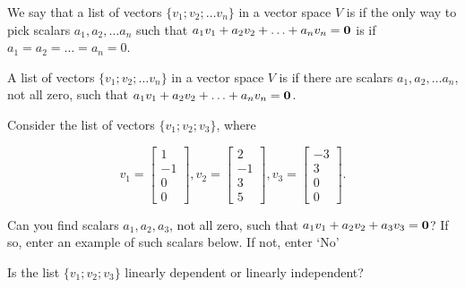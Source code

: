 \edXsolution{ 
}


\endedxproblem


\endedxvertical





We say that a list of vectors $\{v_1; v_2; \ldots v_n\}$ in a vector space $V$ is 
{} if the only way to pick scalars $a_1, a_2, \ldots a_n$ such that
$a_1v_1 + a_2v_2 + \ldots + a_nv_n = \mathbf{0}$ is if $a_1 = a_2 = \ldots = a_n = 0$.  

A list of vectors $\{v_1; v_2; \ldots v_n\}$ in a vector space $V$ is 
{} if there are scalars $a_1, a_2, \ldots a_n$, not all zero, such that
$a_1v_1 + a_2v_2 + \ldots + a_nv_n = \mathbf{0}$.  


\endedxtext



Consider the list of vectors $\{v_1; v_2; v_3\}$, where

\[v_1 = \left[\begin{array}{c} 1 \\ -1  \\ 0 \\ 0 \end{array} \right], 
v_2 = \left[\begin{array}{c} 2 \\ -1  \\ 3 \\ 5 \end{array} \right],  
v_3 = \left[\begin{array}{c} -3 \\ 3  \\ 0 \\ 0 \end{array} \right]. \]

Can you find scalars $a_1, a_2, a_3$, not all zero, such that 
$a_1v_1 + a_2 v_2 + a_3 v_3 = \mathbf{0}$?  If so, enter an example of such scalars below.
If not, enter `No'  




Is the list $\{v_1; v_2; v_3\}$ linearly dependent or linearly independent?  



